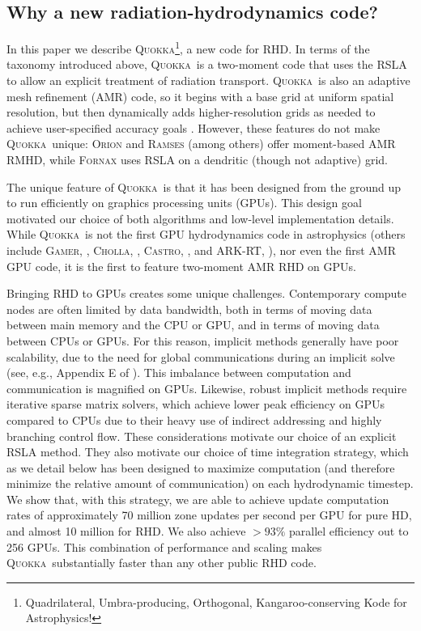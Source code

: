 \documentclass[fleqn,usenatbib]{mnras}
\newcommand{\quokka}{\textsc{Quokka}}
\begin{document}
\subsection{Why a new radiation-hydrodynamics code?}

In this paper we describe \quokka\footnote{Quadrilateral, Umbra-producing, Orthogonal, Kangaroo-conserving Kode for Astrophysics!}, a new code for RHD. In terms of the taxonomy introduced above, \quokka~is a two-moment code that uses the RSLA to allow an explicit treatment of radiation transport. \quokka~is also an adaptive mesh refinement (AMR) code, so it begins with a base grid at uniform spatial resolution, but then dynamically adds higher-resolution grids as needed to achieve user-specified accuracy goals \citep{Berger:1984, Berger:1989}. However, these features do not make \quokka~unique: \textsc{Orion} and \textsc{Ramses} (among others) offer moment-based AMR RMHD, while \textsc{Fornax} uses RSLA on a dendritic (though not adaptive) grid.

The unique feature of \quokka~is that it has been designed from the ground up to run efficiently on graphics processing units (GPUs). This design goal motivated our choice of both algorithms and low-level implementation details. While \quokka~is not the first GPU hydrodynamics code in astrophysics (others include \textsc{Gamer}, \citealt{Schive10a, Schive18a}, \textsc{Cholla}, \citealt{Schneider15a}, \textsc{Castro}, \citealt{Almgren_2020}, and \textsc{ARK-RT}, \citealt{Bloch_2021}), nor even the first AMR GPU code, it is the first to feature two-moment AMR RHD on GPUs.

Bringing RHD to GPUs creates some unique challenges. Contemporary compute nodes are often limited by data bandwidth, both in terms of moving data between main memory and the CPU or GPU, and in terms of moving data between CPUs or GPUs. For this reason, implicit methods generally have poor scalability, due to the need for global communications during an implicit solve (see, e.g., Appendix E of \citealt{Skinner_2019}). This imbalance between computation and communication is magnified on GPUs. Likewise, robust implicit methods require iterative sparse matrix solvers, which achieve lower peak efficiency on GPUs compared to CPUs due to their heavy use of indirect addressing and highly branching control flow. These considerations motivate our choice of an explicit RSLA method. They also motivate our choice of time integration strategy, which as we detail below has been designed to maximize computation (and therefore minimize the relative amount of communication) on each hydrodynamic timestep. We show that, with this strategy, we are able to achieve update computation rates of approximately 70 million zone updates per second per GPU for pure HD, and almost 10 million for RHD. We also achieve $>93\%$ parallel efficiency out to 256 GPUs. This combination of performance and scaling makes \quokka~substantially faster than any other public RHD code.
\end{document}
